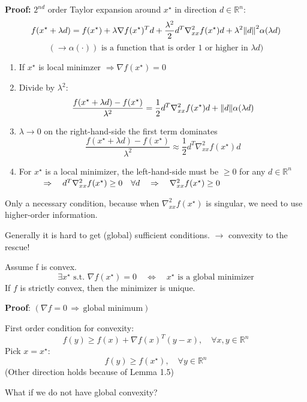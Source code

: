 \documentclass[12pt,a4paper,oneside]{scrartcl}
\newenvironment{lemmabox}[1][]{
	\refstepcounter{lemma}
	\begin{tcolorbox}[colback=teal!5!white,
		colframe=teal!60!black,
		fonttitle=\bfseries,
		boxrule=0.8pt,
		arc=3pt,
		left=8pt,right=8pt,top=6pt,bottom=6pt,
		title={Lemma \thelemma\if\relax\detokenize{#1}\relax\else\ (#1)\fi}]
		}{
	\end{tcolorbox}
}
\begin{document}
	\textbf{Proof:} $2^{nd}$ order Taylor expansion around $x^\star$ in direction $d \in \mathbb{R}^n$:
	\[
		f(x^\star + \lambda d) = f(x^\star) + \lambda\nabla f(x^\star)^Td + \frac{\lambda^2}{2}d^T \nabla_{xx}^2 f(x^\star) d + \lambda^2\norm{d}^2\alpha (\lambda d)
	\]
	\[
		(\to\alpha(\cdot)) \text{ is a function that is order $1$ or higher in $\lambda d$})
	\]
	\begin{enumerate}
		\item If $x^\star$ is local minimzer $\Rightarrow\nabla f(x^\star) = 0$
		\item Divide by $\lambda^2$:
		\[
			\frac{f(x^\star+\lambda d)-f(x^\star)}{\lambda^2} = \frac{1}{2} d^T \nabla_{xx}^2 f(x^\star) d + \norm{d}\alpha (\lambda d)
		\]
		\item $\lambda \to 0$ on the right-hand-side the first term dominates
		\[
			\frac{f(x^\star+\lambda d)-f(x^\star)}{\lambda^2} \approx \frac{1}{2} d^T \nabla_{xx}^2 f(x^\star) d
		\]
		\item For $x^\star$ is a local minimizer, the left-hand-side must be $\geq 0$ for any $d\in\mathbb{R}^n$\\$\hspace*{1cm}\Rightarrow\quad d^T \nabla_{xx}^2 f(x^\star) \geq 0 \quad\forall d\quad \Rightarrow\quad \nabla_{xx}^2 f(x^\star)\geq0$\hfill\qedsymbol{}
	\end{enumerate}
	
	Only a necessary condition, because when $\nabla_{xx}^2 f(x^\star)$ is singular, we need to use higher-order information.
	
	Generally it is hard to get (global) sufficient conditions. $\to$ convexity to the rescue!
	
	\begin{lemmabox}[First order N\&S condition for global minimizers]
		Assume f is convex.
		\[
			\exists x^\star \text{ s.t. } \nabla f(x^\star) = 0 \quad\Leftrightarrow\quad x^\star \text{ is a global minimizer}
		\]
		If $f$ is  strictly convex, then the minimizer is unique.
	\end{lemmabox} 	
	
	\textbf{Proof}: $(\nabla f = 0\,\Rightarrow\,\text{global minimum})$
	
	First order condition for convexity:
	\[
		f(y) \geq f(x) + \nabla f(x)^T(y-x),\quad\forall x,y\in\mathbb{R}^n
	\]
	Pick $x = x^\star$:
	\[
		f(y) \geq f(x^\star),\quad\forall y\in\mathbb{R}^n
	\]
	(Other direction holds because of Lemma 1.5)
	
	What if we do not have global convexity?
	
\end{document}
